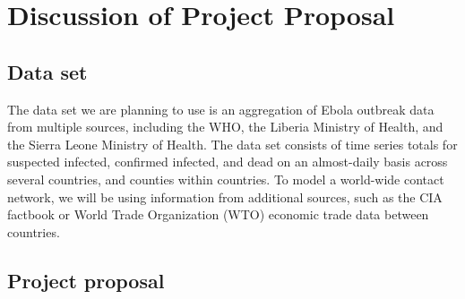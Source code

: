 \documentclass[10pt, journal,onecolumn]{IEEEtran}
\begin{document}
\bigskip


\section{Discussion of Project Proposal}
\label{sec:ProjectProposal}
\bigskip

\subsection{Data set}

The data set we are planning to use \citep{cmriversdata} is an aggregation of Ebola outbreak data
from multiple sources, including the WHO, the Liberia Ministry of Health, and the Sierra Leone
Ministry of Health. The data set consists of time series totals for suspected infected, confirmed
infected, and dead on an almost-daily basis across several countries, and counties within countries.
To model a world-wide contact network, we will be using information from additional sources, such
as the CIA factbook or World Trade Organization (WTO) economic trade data between countries.



\subsection{Project proposal}

\bigskip
\end{document}
